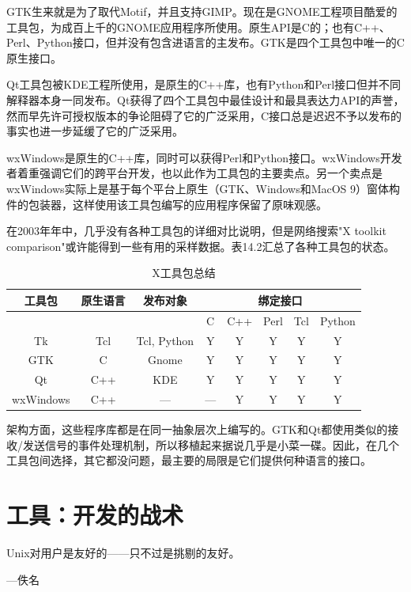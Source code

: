 \documentclass[12pt,oneside]{book}
\begin{document}
GTK生来就是为了取代Motif，并且支持GIMP。现在是GNOME工程项目酷爱的工具包，为成百上千的GNOME应用程序所使用。原生API是C的；也有C++、Perl、Python接口，但并没有包含进语言的主发布。GTK是四个工具包中唯一的C原生接口。

Qt工具包被KDE工程所使用，是原生的C++库，也有Python和Perl接口但并不同解释器本身一同发布。Qt获得了四个工具包中最佳设计和最具表达力API的声誉，然而早先许可授权版本的争论阻碍了它的广泛采用，C接口总是迟迟不予以发布的事实也进一步延缓了它的广泛采用。

wxWindows是原生的C++库，同时可以获得Perl和Python接口。wxWindows开发者着重强调它们的跨平台开发，也以此作为工具包的主要卖点。另一个卖点是wxWindows实际上是基于每个平台上原生（GTK、Windows和MacOS 9）窗体构件的包装器，这样使用该工具包编写的应用程序保留了原味观感。

在2003年年中，几乎没有各种工具包的详细对比说明，但是网络搜索"X toolkit comparison"或许能得到一些有用的采样数据。表14.2汇总了各种工具包的状态。

\begin{table}[H]
\centering
\caption{X工具包总结}
\label{tab:X工具包总结}
\medskip 
\begin{tabular}{@{}cccccccc@{}}
\toprule
工具包 & 原生语言 & 发布对象  & \multicolumn{5}{c}{绑定接口}  \\ \midrule
           &               &                &  C & C++ & Perl  & Tcl & Python \\
Tk & Tcl & Tcl, Python & Y & Y & Y & Y & Y \\
GTK & C & Gnome & Y & Y & Y & Y & Y\\
Qt & C++ & KDE & Y & Y & Y & Y & Y\\
wxWindows & C++ & — & — & Y & Y & Y &  Y
 \\ \bottomrule
\end{tabular}
\end{table}


架构方面，这些程序库都是在同一抽象层次上编写的。GTK和Qt都使用类似的接收/发送信号的事件处理机制，所以移植起来据说几乎是小菜一碟。因此，在几个工具包间选择，其它都没问题，最主要的局限是它们提供何种语言的接口。



\chapter{工具：开发的战术}
\begin{flushright}
Unix对用户是友好的——只不过是挑剔的友好。

{\hfill —佚名}
\end{flushright}
\end{document}
